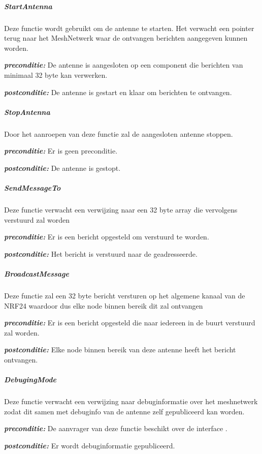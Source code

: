 \documentclass[a4paper, 11pt, oneside]{report}
\begin{document}
\subparagraph{StartAntenna}
\label{DetailedDesign:ros:extern:interfaces:IWirelessCommunication:StartAntenna}
Deze functie wordt gebruikt om de antenne te starten. Het verwacht een pointer terug naar het MeshNetwerk waar de ontvangen berichten aangegeven kunnen worden.

\textbf{\textit{preconditie:}} De antenne is aangesloten op een component die berichten van minimaal 32 byte kan verwerken.

\textbf{\textit{postconditie:}} De antenne is gestart en klaar om berichten te ontvangen.

\subparagraph{StopAntenna}
\label{DetailedDesign:ros:extern:interfaces:IWirelessCommunication:StopAntenna}
Door het aanroepen van deze functie zal de aangesloten antenne stoppen.

\textbf{\textit{preconditie:}} Er is geen preconditie.

\textbf{\textit{postconditie:}} De antenne is gestopt.

\subparagraph{SendMessageTo}
\label{DetailedDesign:ros:extern:interfaces:IWirelessCommunication:SendMessageTo}
Deze functie verwacht een verwijzing naar een 32 byte array die vervolgens verstuurd zal worden

\textbf{\textit{preconditie:}}  Er is een bericht opgesteld om verstuurd te worden.

\textbf{\textit{postconditie:}} Het bericht is verstuurd naar de geadresseerde.

\subparagraph{BroadcastMessage}
\label{DetailedDesign:ros:extern:interfaces:IWirelessCommunication:BroadcastMessage}
Deze functie zal een 32 byte bericht versturen op het algemene kanaal van de NRF24 waardoor dus elke node binnen bereik dit zal ontvangen

\textbf{\textit{preconditie:}} Er is een bericht opgesteld die naar iedereen in de buurt verstuurd zal worden.

\textbf{\textit{postconditie:}} Elke node binnen bereik van deze antenne heeft het bericht ontvangen.


\subparagraph{DebugingMode}
\label{DetailedDesign:ros:extern:interfaces:IWirelessCommunication:DebuggingMode}
Deze functie verwacht een verwijzing naar debuginformatie over het meshnetwerk zodat dit samen met debuginfo van de antenne zelf gepubliceerd kan worden.

\textbf{\textit{preconditie:}} De aanvrager van deze functie beschikt over de interface .

\textbf{\textit{postconditie:}} Er wordt debuginformatie gepubliceerd.
\end{document}
